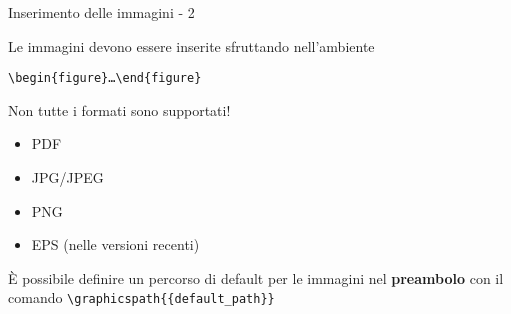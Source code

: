 \begin{frame}{Inserimento delle immagini - 2}
	
Le immagini devono essere inserite sfruttando nell'ambiente 
\centerline{
\texttt{\textbackslash{}begin\{figure\}\dots{}\textbackslash{}end\{figure\}}
}

\vfill

Non tutte i formati sono supportati!
\begin{itemize}
	\item PDF
	\item JPG/JPEG
	\item PNG
	\item EPS (nelle versioni recenti)
\end{itemize}

\vfill

È possibile definire un percorso di default per le immagini nel 
\textbf{preambolo} con il comando 
\texttt{\textbackslash{}graphicspath\{\{default\_path\}\}}

\end{frame}